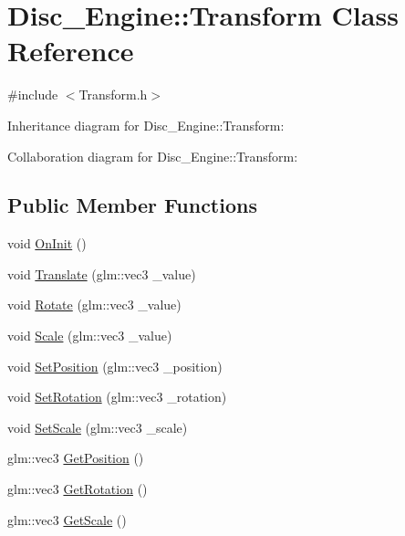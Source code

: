 \hypertarget{class_disc___engine_1_1_transform}{}\section{Disc\+\_\+\+Engine\+:\+:Transform Class Reference}
\label{class_disc___engine_1_1_transform}


{\ttfamily \#include $<$Transform.\+h$>$}



Inheritance diagram for Disc\+\_\+\+Engine\+:\+:Transform\+:


Collaboration diagram for Disc\+\_\+\+Engine\+:\+:Transform\+:
\subsection*{Public Member Functions}
\begin{DoxyCompactItemize}
\item 
void \mbox{\hyperlink{class_disc___engine_1_1_transform_a5cc30c86c2fe43fae5fb88b6c8646894}{On\+Init}} ()
\item 
void \mbox{\hyperlink{class_disc___engine_1_1_transform_a1833aba8d8096be5d18aa1a809d155f3}{Translate}} (glm\+::vec3 \+\_\+value)
\item 
void \mbox{\hyperlink{class_disc___engine_1_1_transform_acf1f201addf16a7421e91ba4fe5aa7cb}{Rotate}} (glm\+::vec3 \+\_\+value)
\item 
void \mbox{\hyperlink{class_disc___engine_1_1_transform_a4c7cfd8a470a0d454c31b5085f61b23e}{Scale}} (glm\+::vec3 \+\_\+value)
\item 
void \mbox{\hyperlink{class_disc___engine_1_1_transform_ae6273120a938b99bbec52900770e6935}{Set\+Position}} (glm\+::vec3 \+\_\+position)
\item 
void \mbox{\hyperlink{class_disc___engine_1_1_transform_a86a269ca9052de83f6037b3ff88e9a77}{Set\+Rotation}} (glm\+::vec3 \+\_\+rotation)
\item 
void \mbox{\hyperlink{class_disc___engine_1_1_transform_af741bc745e441e4c3175f9aff07c5d98}{Set\+Scale}} (glm\+::vec3 \+\_\+scale)
\item 
glm\+::vec3 \mbox{\hyperlink{class_disc___engine_1_1_transform_ab56d0806d3d2d67a0587c7ffebf0b2d0}{Get\+Position}} ()
\item 
glm\+::vec3 \mbox{\hyperlink{class_disc___engine_1_1_transform_a5af4d340711239a3517813e9122c6065}{Get\+Rotation}} ()
\item 
glm\+::vec3 \mbox{\hyperlink{class_disc___engine_1_1_transform_a28a37980813cba4e8bada11d5ee6d070}{Get\+Scale}} ()
\end{DoxyCompactItemize}
